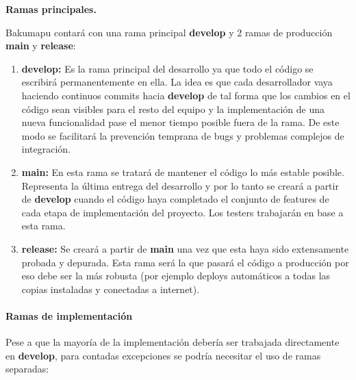 \noindent\textbf{Ramas principales.}\label{flujo:ramas-principales}

\noindent Bakumapu contará con una rama principal \textbf{develop} y 2 ramas de producción \textbf{main} y \textbf{release}:

\begin{enumerate}
	\renewcommand{\labelenumi}{\alph{enumi}.}
	\item \textbf{develop:} Es la rama principal del desarrollo ya que todo el código se escribirá permanentemente en ella. La idea es que cada desarrollador vaya haciendo continuos commits hacia \textbf{develop} de tal forma que los cambios en el código sean visibles para el resto del equipo y la implementación de una nueva funcionalidad pase el menor tiempo posible fuera de la rama. De este modo se facilitará la prevención temprana de bugs y problemas complejos de integración.
	
	\item \textbf{main:} En esta rama se tratará de mantener el código lo más estable posible. Representa la última entrega del desarrollo y por lo tanto se creará a partir de \textbf{develop} cuando el código haya completado el conjunto de features de cada etapa de implementación del proyecto. Los testers trabajarán en base a esta rama.
	
	\item \textbf{release:} Se creará a partir de \textbf{main} una vez que esta haya sido extensamente probada y depurada. Esta rama será la que pasará el código a producción por eso debe ser la más robusta (por ejemplo deploys automáticos a todas las copias instaladas y conectadas a internet).
\end{enumerate}

\paragraph{Ramas de implementación}\label{pg:ramas-de-implementacion}

Pese a que la mayoría de la implementación debería ser trabajada directamente en \textbf{develop}, para contadas excepciones se podría necesitar el uso de ramas separadas:

